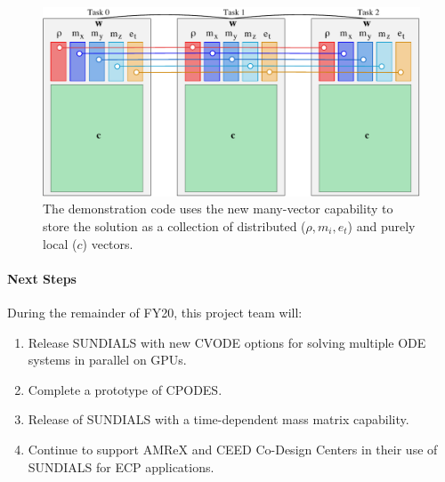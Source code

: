 \begin{figure}[htb]
	\centering
	\includegraphics[width=6in]{projects/2.3.3-MathLibs/2.3.3.12-SUNDIALS-hypre/manyvector_v2.pdf}
	\caption{\label{fig:sun-many-demo}The demonstration code uses the new many-vector capability to store the solution as a collection of distributed ($\rho,m_i, e_t$) and purely local ($c$) vectors.}
\end{figure}




\paragraph{Next Steps}

During the remainder of FY20, this project team will:
\begin{enumerate}
\item Release SUNDIALS with new CVODE options for solving multiple ODE systems in parallel on GPUs.
\item Complete a prototype of CPODES.
\item Release of SUNDIALS with a time-dependent mass matrix capability.
\item Continue to support AMReX and CEED Co-Design Centers in their use of SUNDIALS for ECP applications.
\end{enumerate}
